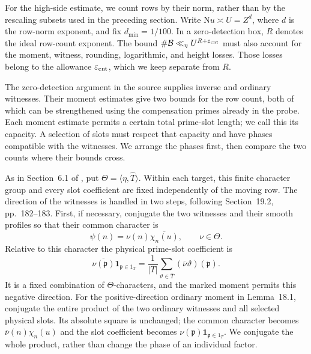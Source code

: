 \documentclass[10pt,reqno,a4paper]{amsart}
\theoremstyle{remark}
\newcommand{\N}{\mathrm N}
\newcommand{\one}{\mathbf 1}
\newcommand{\eps}{\varepsilon}
\newcommand{\pp}{\mathfrak p}
\begin{document}
For the high-side estimate, we count rows by their norm, rather than by
the rescaling subsets used in the preceding section. Write
$\N u\asymp U=Z^d$, where $d$ is the row-norm exponent, and fix
$d_{\min}=1/100$. In a zero-detection box, $R$ denotes the ideal
row-count exponent. The bound $\#\mathcal B\ll_\eta U^{R+\eps_{\rm cnt}}$
must also account for the moment, witness, rounding, logarithmic, and
height losses. Those losses belong to the allowance $\eps_{\rm cnt}$,
which we keep separate from $R$.

The zero-detection argument in the source supplies inverse and ordinary
witnesses. Their moment estimates give two bounds for the row count, both
of which can be strengthened using the compensation primes already in
the probe. Each moment estimate permits a certain total prime-slot length;
we call this its capacity. A selection of slots must respect that capacity
and have phases compatible with the witnesses. We arrange the phases
first, then compare the two counts where their bounds cross.

As in Section~6.1 of \cite{q30}, put
$\Theta=\langle\eta,\widehat T\rangle$. Within each target, this finite
character group and every slot coefficient are fixed independently of
the moving row. The direction of the witnesses is handled in two
steps, following Section~19.2, pp.~182--183. First, if necessary,
conjugate the two witnesses and their smooth profiles so that their
common character is
\[
                 \psi(n)=\nu(n)\overline{\chi_n(u)},
                 \qquad \nu\in\Theta.
\]
Relative to this character the physical prime-slot coefficient is
\[
 \overline{\nu(\pp)}\one_{\pp\in1_T}
   =\frac1{|T|}\sum_{\vartheta\in\widehat T}
          (\overline\nu\vartheta)(\pp).
\]
It is a fixed combination of $\Theta$-characters, and the marked
moment permits this negative direction. For the positive-direction
ordinary moment in Lemma~18.1, conjugate the entire product of the
two ordinary witnesses and all selected physical slots. Its absolute
square is unchanged; the common character becomes
$\overline\nu(n)\chi_n(u)$ and the slot coefficient becomes
$\nu(\pp)\one_{\pp\in1_T}$. We conjugate the whole product, rather than change the phase of
an individual factor.
\end{document}
